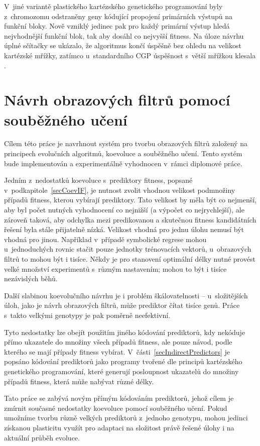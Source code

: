 V~jiné variantě plastického kartézského genetického programování byly z~chromozomu odstraněny geny kódující  propojení primárních výstupů na funkční bloky. Nově vzniklý jedinec pak pro každý primární výstup hledá nejvhodnější funkční blok, tak aby dosáhl co nejvyšší fitness. Na úloze návrhu úplné sčítačky se ukázalo, že algoritmus končí úspěšně bez ohledu na velikost kartézské mřížky, zatímco u~standardního CGP úspěšnost s~větší mřížkou klesala \cite{KhatirPlasticCGP}.

\chapter{Návrh obrazových filtrů pomocí souběžného učení}
\label{chDesign}

Cílem této práce je navrhnout systém pro tvorbu obrazových filtrů založený na principech evolučních algoritmů, koevoluce a souběžného učení. Tento systém bude implementován a experimentálně vyhodnocen v~rámci diplomové práce.

Jedním z~nedostatků koevoluce s~prediktory fitness, popsané v~podkapitole~\ref{secCoevIF}, je nutnost zvolit vhodnou velikost podmnožiny případů fitness, kterou vybírají prediktory. Tato velikost by měla být co nejmenší, aby byl počet nutných vyhodnocení co nejnižší (a výpočet co nejrychlejší), ale zároveň taková, aby odchylka mezi predikovanou a skutečnou fitness kandidátních řešení byla stále přijatelně nízká. Velikost vhodná pro jednu úlohu nemusí být vhodná pro jinou. Například v~případě symbolické regrese mohou u~jednoduchých rovnic stačit pouze jednotky trénovacích vektorů, u~obrazových filtrů to mohou být i tisíce. Někdy je pro stanovení optimální délky nutné provést velké množství experimentů s~různým nastavením; mohou to být i tisíce nezávislých běhů.

Další slabinou koevolučního návrhu je i problém škálovatelnosti -- u~složitějších úloh, jako je návrh obrazových filtrů, může prediktor čítat tisíce genů. Práce s~takto velkými genotypy je pak poměrně neefektivní.

Tyto nedostatky lze obejít použitím jiného kódování prediktorů, kdy nekóduje přímo ukazatele do množiny všech případů fitness, ale pouze návod, podle kterého se mají případy fitness vybírat. V~části~\ref{secIndirectPredictors} je popsáno kódování prediktorů jako programy tvořené dle principů kartézského genetického programování, které generují posloupnost ukazatelů do množiny případů fitness, která může nabývat různé délky.

Tato práce se zabývá novým přímým kódováním prediktorů, jehož cílem je zmírnit současné nedostatky koevoluce pomocí souběžného učení. Pokud umožníme tvorbu různě velkých prediktorů z~jednoho genotypu, mohou jedinci získanou plasticitu využít pro adaptaci na složitost právě řešené úlohy i na aktuální průběh evoluce.


